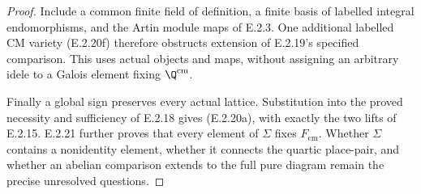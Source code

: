 \begin{proof}
Include a common finite field of definition, a finite
basis of labelled integral endomorphisms, and the
Artin module maps of E.2.3. One additional labelled
CM variety (E.2.20f) therefore obstructs extension
of E.2.19's specified comparison. This uses actual
objects and maps, without assigning an arbitrary
idele to a Galois element fixing \(\Q^{\mathrm{cm}}\).

Finally a global sign preserves every actual lattice.
Substitution into the proved necessity and sufficiency
of E.2.18 gives (E.2.20a), with exactly the two lifts
of E.2.15. E.2.21 further proves that every element
of \(\Sigma\) fixes \(F_{\mathrm{cm}}\).
Whether \(\Sigma\) contains a nonidentity
element, whether it connects the quartic place-pair,
and whether an abelian comparison extends to the full
pure diagram remain the precise unresolved questions.
\end{proof}

